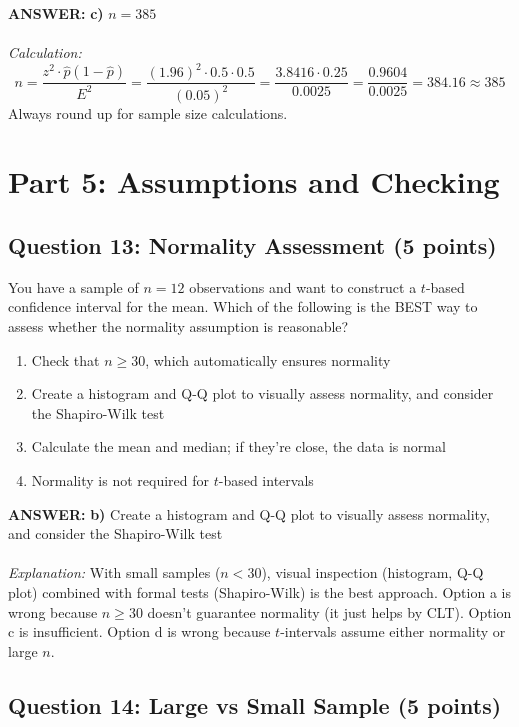 \documentclass[11pt]{article}
\newcommand{\answer}[1]{\par\vspace{0.3em}\colorbox{green!10}{\parbox{\dimexpr\textwidth-2\fboxsep}{\textbf{ANSWER:} #1}}\vspace{0.3em}\par}
\begin{document}
\answer{\textbf{c)} $n = 385$ \\ \\
\textit{Calculation:}
$$n = \frac{z^2 \cdot \hat{p}(1-\hat{p})}{E^2} = \frac{(1.96)^2 \cdot 0.5 \cdot 0.5}{(0.05)^2} = \frac{3.8416 \cdot 0.25}{0.0025} = \frac{0.9604}{0.0025} = 384.16 \approx 385$$
Always round up for sample size calculations.}

\section*{Part 5: Assumptions and Checking}

\subsection*{Question 13: Normality Assessment (5 points)}

You have a sample of $n = 12$ observations and want to construct a $t$-based confidence interval for the mean. Which of the following is the BEST way to assess whether the normality assumption is reasonable?

\begin{enumerate}[label=\alph*)]
\item Check that $n \geq 30$, which automatically ensures normality
\item Create a histogram and Q-Q plot to visually assess normality, and consider the Shapiro-Wilk test
\item Calculate the mean and median; if they're close, the data is normal
\item Normality is not required for $t$-based intervals
\end{enumerate}

\answer{\textbf{b)} Create a histogram and Q-Q plot to visually assess normality, and consider the Shapiro-Wilk test \\ \\
\textit{Explanation:} With small samples ($n < 30$), visual inspection (histogram, Q-Q plot) combined with formal tests (Shapiro-Wilk) is the best approach. Option a is wrong because $n \geq 30$ doesn't guarantee normality (it just helps by CLT). Option c is insufficient. Option d is wrong because $t$-intervals assume either normality or large $n$.}

\subsection*{Question 14: Large vs Small Sample (5 points)}
\end{document}
